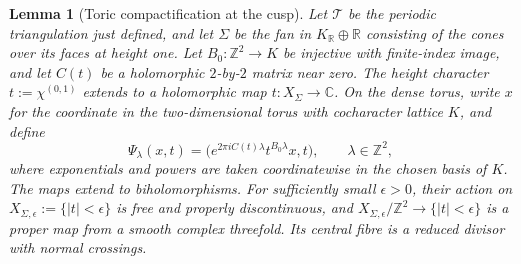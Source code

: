 \documentclass[11pt]{article}
\newtheorem{lemma}[theorem]{Lemma}
\theoremstyle{definition}
\theoremstyle{remark}
\numberwithin{equation}{section}
\newcommand{\CC}{\mathbb C}
\newcommand{\ZZ}{\mathbb Z}
\begin{document}
\begin{lemma}[Toric compactification at the cusp]\label{lem:an-finite-index-cusp}
Let $\mathcal T$ be the periodic triangulation just defined, and let
$\Sigma$ be the fan in
$K_{\mathbb R}\oplus\mathbb R$ consisting of the cones over its faces
at height one.  Let $B_0:\ZZ^2\to K$ be injective with finite-index
image, and let $C(t)$ be a holomorphic $2$-by-$2$ matrix near zero.
The height character $t:=\chi^{(0,1)}$ extends to a holomorphic map
$t:X_\Sigma\to\CC$.  On the dense torus, write $x$ for the coordinate
in the two-dimensional torus with cocharacter lattice $K$, and define
\begin{equation}\label{eq:an-toric-action}
 \Psi_\lambda(x,t)
 =\bigl(e^{2\pi iC(t)\lambda}t^{B_0\lambda}x,t\bigr),
 \qquad \lambda\in\ZZ^2,
\end{equation}
where exponentials and powers are taken coordinatewise in the chosen basis
of $K$.  The maps extend to biholomorphisms.  For sufficiently
small $\epsilon>0$, their action on
$X_{\Sigma,\epsilon}:=\{|t|<\epsilon\}$ is free and properly
discontinuous, and
$X_{\Sigma,\epsilon}/\ZZ^2\to\{|t|<\epsilon\}$ is a proper map from a
smooth complex threefold.  Its central fibre is a reduced divisor with
normal crossings.
\end{lemma}
\end{document}
